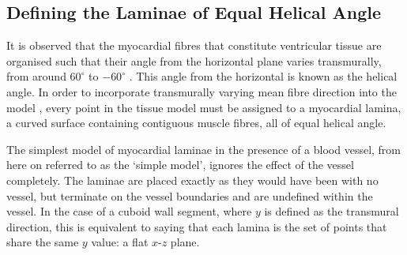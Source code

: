 \subsection{Defining the Laminae of Equal Helical Angle} %
\label{sec:defining_the_laminae_of_equal_helical_angle}
  It is observed that the myocardial fibres that constitute ventricular tissue are organised such that their angle from the horizontal plane varies transmurally, from around $60^\circ$ to $-60^\circ$ \cite{StreeterJr1969}. This angle from the horizontal is known as the helical angle. In order to incorporate transmurally varying mean fibre direction into the model \cite{Potse2006}, every point in the tissue model must be assigned to a myocardial lamina, a curved surface containing contiguous muscle fibres, all of equal helical angle.
  
  The simplest model of myocardial laminae in the presence of a blood vessel, from here on referred to as the `simple model', ignores the effect of the vessel completely. The laminae are placed exactly as they would have been with no vessel, but terminate on the vessel boundaries and are undefined within the vessel. In the case of a cuboid wall segment, where $y$ is defined as the transmural direction, this is equivalent to saying that each lamina is the set of points that share the same $y$ value: a flat $x$-$z$ plane.

